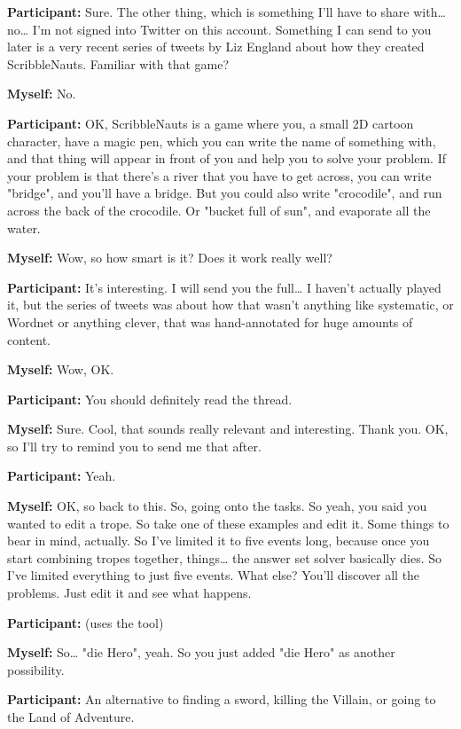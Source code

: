 \documentclass[11pt]{report}
\begin{document}
\begin{linenumbers}
\textbf{Participant:} Sure. The other thing, which is something I'll have to share with\ldots{} no\ldots{} I'm not signed into Twitter on this account. Something I can send to you later is a very recent series of tweets by Liz England about how they created ScribbleNauts. Familiar with that game?

\textbf{Myself:} No.

\textbf{Participant:} OK, ScribbleNauts is a game where you, a small 2D cartoon character, have a magic pen, which you can write the name of something with, and that thing will appear in front of you and help you to solve your problem. If your problem is that there's a river that you have to get across, you can write "bridge", and you'll have a bridge. But you could also write "crocodile", and run across the back of the crocodile. Or "bucket full of sun", and evaporate all the water.

\textbf{Myself:} Wow, so how smart is it? Does it work really well?

\textbf{Participant:} It's interesting. I will send you the full\ldots{} I haven't actually played it, but the series of tweets was about how that wasn't anything like systematic, or Wordnet or anything clever, that was hand-annotated for huge amounts of content.

\textbf{Myself:} Wow, OK.

\textbf{Participant:} You should definitely read the thread.

\textbf{Myself:} Sure. Cool, that sounds really relevant and interesting. Thank you. OK, so I'll try to remind you to send me that after.

\textbf{Participant:} Yeah.

\textbf{Myself:} OK, so back to this. So, going onto the tasks. So yeah, you said you wanted to edit a trope. So take one of these examples and edit it. Some things to bear in mind, actually. So I've limited it to five events long, because once you start combining tropes together, things\ldots{} the answer set solver basically dies. So I've limited everything to just five events. What else? You'll discover all the problems. Just edit it and see what happens.

\textbf{Participant:} (uses the tool)

\textbf{Myself:} So\ldots{} "die Hero", yeah. So you just added "die Hero" as another possibility.

\textbf{Participant:} An alternative to finding a sword, killing the Villain, or going to the Land of Adventure.


\end{linenumbers}
\end{document}
